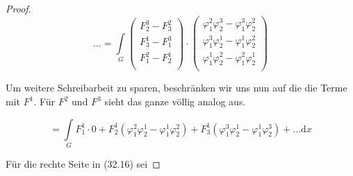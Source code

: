 \begin{proof}
\leftskip=0pt
\begin{equation*}
...=
\int\limits_G
\begin{pmatrix}
    F_2^3 - F_3^2 \\
    F_3^1 - F_1^3 \\
    F_1^2 - F_2^1 \\
\end{pmatrix}
\cdot
\begin{pmatrix}
    \varphi_1^2 \varphi_2^3 - \varphi_1^3 \varphi_2^2\\
    \varphi_1^3 \varphi_2^1 - \varphi_1^1 \varphi_2^2\\
    \varphi_1^1 \varphi_2^2 - \varphi_1^2 \varphi_2^1\\
\end{pmatrix}
\end{equation*}

Um weitere Schreibarbeit zu sparen, beschränken wir uns nun auf die die Terme mit $F^1$. Für $F^2$ und $F^3$ sieht das ganze 
völlig analog aus.

\begin{equation*}
    =
    \int\limits_G F_1^1 \cdot 0
    +
    F_2^1 (\varphi_1^2 \varphi_2^1 - \varphi_1^1 \varphi_2^2)
    +
    F_3^1 (\varphi_1^3 \varphi_2^1 - \varphi_1^1 \varphi_2^3)
    +
    \ldots \mathrm{d}x
    \tag{$\heartsuit$}
\end{equation*}

Für die rechte Seite in (32.16) sei


\end{proof}
